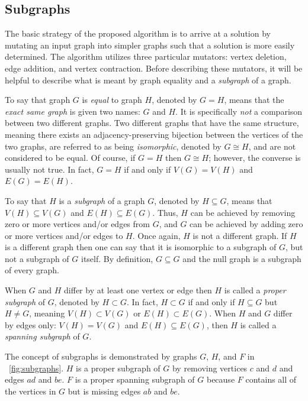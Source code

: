\subsection{Subgraphs}\label{sec:sub:subgraphs}

The basic strategy of the proposed algorithm is to arrive at a solution by mutating an input graph into simpler
graphs such that a solution is more easily determined.  The algorithm utilizes three particular mutators: vertex
deletion, edge addition, and vertex contraction.  Before describing these mutators, it will be helpful to describe
what is meant by graph equality and a \emph{subgraph} of a graph.

To say that graph \(G\) is \emph{equal} to graph \(H\), denoted by \(G=H\), means that the \emph{exact same graph}
is given two names: \(G\) and \(H\).  It is specifically \emph{not} a comparison between two different graphs.  Two
different graphs that have the same structure, meaning there exists an adjacency-preserving bijection between the
vertices of the two graphs, are referred to as being \emph{isomorphic}, denoted by \(G\cong H\), and are not
considered to be equal.  Of course, if \(G=H\) then \(G\cong H\); however, the converse is usually not true.  In
fact, \(G=H\) if and only if \(V(G)=V(H)\) and \(E(G)=E(H)\).

To say that \(H\) is a \emph{subgraph} of a graph \(G\), denoted by \(H\subseteq G\), means that \(V(H)\subseteq
V(G)\) and \(E(H)\subseteq E(G)\).  Thus, \(H\) can be achieved by removing zero or more vertices and/or edges from
\(G\), and \(G\) can be achieved by adding zero or more vertices and/or edges to \(H\).  Once again, \(H\) is not a
different graph.  If \(H\) is a different graph then one can say that it is isomorphic to a subgraph of \(G\), but
not a subgraph of \(G\) itself.  By definition, \(G\subseteq G\) and the null graph is a subgraph of every graph.

When \(G\) and \(H\) differ by at least one vertex or edge then \(H\) is called a \emph{proper subgraph} of \(G\),
denoted by \(H\subset G\).  In fact, \(H\subset G\) if and only if \(H\subseteq G\) but \(H\ne G\), meaning
\(V(H)\subset V(G)\) or \(E(H)\subset E(G)\).  When \(H\) and \(G\) differ by edges only: \(V(H)=V(G)\) and
\(E(H)\subseteq E(G)\), then \(H\) is called a \emph{spanning subgraph} of \(G\).

The concept of subgraphs is demonstrated by graphs \(G\), \(H\), and \(F\) in \figurename~\ref{fig:subgraphs}.
\(H\) is a proper subgraph of \(G\) by removing vertices \(c\) and \(d\) and edges \(ad\) and \(be\).  \(F\) is a
proper spanning subgraph of \(G\) because \(F\) contains all of the vertices in \(G\) but is missing edges \(ab\)
and \(be\).

